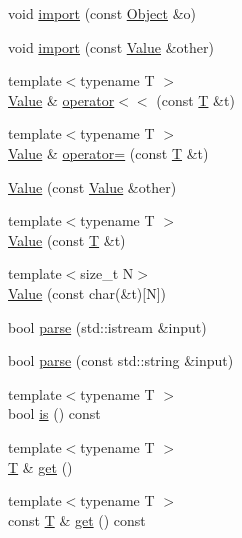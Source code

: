 \begin{DoxyCompactItemize}
\item 
void \hyperlink{classjsonxx_1_1_value_ac33910bc464d6a7d42024c520cff98e3}{import} (const \hyperlink{classjsonxx_1_1_object}{Object} \&o)
\item 
void \hyperlink{classjsonxx_1_1_value_a0b1236b64e06fc13e11e6d00174ced91}{import} (const \hyperlink{classjsonxx_1_1_value}{Value} \&other)
\item 
{\footnotesize template$<$typename T $>$ }\\\hyperlink{classjsonxx_1_1_value}{Value} \& \hyperlink{classjsonxx_1_1_value_a1e517930ae7165463902448438ff37f9}{operator$<$$<$} (const \hyperlink{http__parser_8c_ad24d0de3f597ca60dd95c4bc59c2ff73}{T} \&t)
\item 
{\footnotesize template$<$typename T $>$ }\\\hyperlink{classjsonxx_1_1_value}{Value} \& \hyperlink{classjsonxx_1_1_value_a99b6ad0425396282570c175a0ce33d46}{operator=} (const \hyperlink{http__parser_8c_ad24d0de3f597ca60dd95c4bc59c2ff73}{T} \&t)
\item 
\hyperlink{classjsonxx_1_1_value_a043b4fd42c972d41a19aeeea087e8b0e}{Value} (const \hyperlink{classjsonxx_1_1_value}{Value} \&other)
\item 
{\footnotesize template$<$typename T $>$ }\\\hyperlink{classjsonxx_1_1_value_aee701407f5c79923d2d12501d63a0186}{Value} (const \hyperlink{http__parser_8c_ad24d0de3f597ca60dd95c4bc59c2ff73}{T} \&t)
\item 
{\footnotesize template$<$size\+\_\+t N$>$ }\\\hyperlink{classjsonxx_1_1_value_a80bb965461a78b8fb3dc79a160271236}{Value} (const char(\&t)\mbox{[}N\mbox{]})
\item 
bool \hyperlink{classjsonxx_1_1_value_a7f8013d2eedaf1f2ae25cddf549672a7}{parse} (std\+::istream \&input)
\item 
bool \hyperlink{classjsonxx_1_1_value_a217b0c643ec0aca7100dba4675a8e32a}{parse} (const std\+::string \&input)
\item 
{\footnotesize template$<$typename T $>$ }\\bool \hyperlink{classjsonxx_1_1_value_a33db42bf7cd0bcecceb7301a79b6472e}{is} () const 
\item 
{\footnotesize template$<$typename T $>$ }\\\hyperlink{http__parser_8c_ad24d0de3f597ca60dd95c4bc59c2ff73}{T} \& \hyperlink{classjsonxx_1_1_value_a005e7c83c9c76d602f1bcce60bf0780d}{get} ()
\item 
{\footnotesize template$<$typename T $>$ }\\const \hyperlink{http__parser_8c_ad24d0de3f597ca60dd95c4bc59c2ff73}{T} \& \hyperlink{classjsonxx_1_1_value_afdf90e84e03877790afcbf2ff2dd96a9}{get} () const 

\end{DoxyCompactItemize}

